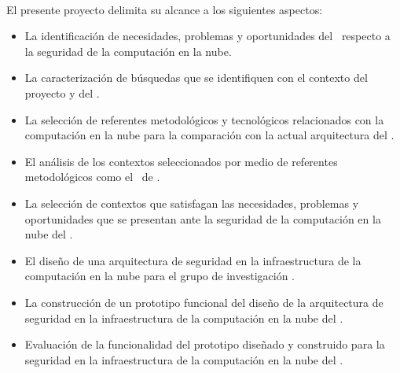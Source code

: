 \label{cap:alcance}
\mbox{}\\
\noindent
El presente proyecto delimita su alcance a los siguientes aspectos:

\begin{itemize}
	\item La identificación de necesidades, problemas y oportunidades del \GRID\ respecto a la seguridad de la computación en la nube. 
	\item La caracterización de búsquedas que se identifiquen con el contexto del proyecto y del \GRID.
	\item La selección de referentes metodológicos y tecnológicos relacionados con la computación en la nube para la comparación con la actual arquitectura del \GRID.
	\item El análisis de los contextos seleccionados por medio de referentes metodológicos como el \DAR\ de \CMMI. 
	\item La selección de contextos que satisfagan las necesidades, problemas y oportunidades que se presentan ante la seguridad de la computación en la nube del \GRID.
	\item El diseño de una arquitectura de seguridad en la infraestructura de la computación en la nube para el grupo de investigación \GRID.
	\item La construcción de un prototipo funcional del diseño de la arquitectura de seguridad en la infraestructura de la computación en la nube del \GRID.
	\item Evaluación de la funcionalidad del prototipo diseñado y construido para la seguridad en la infraestructura de la computación en la nube del \GRID.
\end{itemize}
